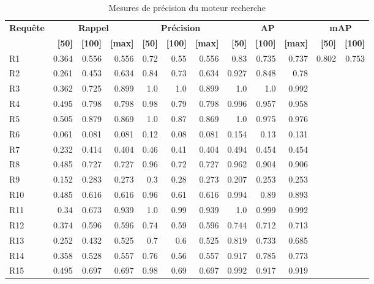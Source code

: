 \begin{table}[H]
\centering
\begin{tabular}{l|rrr|rrr|rrr|rr}
\toprule
\textbf{Requête} & \multicolumn{3}{c}{\textbf{Rappel}} & \multicolumn{3}{c}{\textbf{Précision}} & \multicolumn{3}{c}{\textbf{AP}} & \multicolumn{2}{c}{\textbf{mAP}} \\
 & \textbf{[50]} & \textbf{[100]} & \textbf{[max]} & \textbf{[50]} & \textbf{[100]} & \textbf{[max]} & \textbf{[50]} & \textbf{[100]} & \textbf{[max]} & \textbf{[50]} & \textbf{[100]} \\
\midrule
R1 & 0.364 & 0.556 & 0.556 & 0.72 & 0.55 & 0.556 & 0.83 & 0.735 & 0.737 & \multirow{15}{*}{0.802} & \multirow{15}{*}{0.753} \\
R2 & 0.261 & 0.453 & 0.634 & 0.84 & 0.73 & 0.634 & 0.927 & 0.848 & 0.78 \\
R3 & 0.362 & 0.725 & 0.899 & 1.0 & 1.0 & 0.899 & 1.0 & 1.0 & 0.992 \\
R4 & 0.495 & 0.798 & 0.798 & 0.98 & 0.79 & 0.798 & 0.996 & 0.957 & 0.958 \\
R5 & 0.505 & 0.879 & 0.869 & 1.0 & 0.87 & 0.869 & 1.0 & 0.975 & 0.976 \\
R6 & 0.061 & 0.081 & 0.081 & 0.12 & 0.08 & 0.081 & 0.154 & 0.13 & 0.131 \\
R7 & 0.232 & 0.414 & 0.404 & 0.46 & 0.41 & 0.404 & 0.494 & 0.454 & 0.454 \\
R8 & 0.485 & 0.727 & 0.727 & 0.96 & 0.72 & 0.727 & 0.962 & 0.904 & 0.906 \\
R9 & 0.152 & 0.283 & 0.273 & 0.3 & 0.28 & 0.273 & 0.207 & 0.253 & 0.253 \\
R10 & 0.485 & 0.616 & 0.616 & 0.96 & 0.61 & 0.616 & 0.994 & 0.89 & 0.893 \\
R11 & 0.34 & 0.673 & 0.939 & 1.0 & 0.99 & 0.939 & 1.0 & 0.999 & 0.992 \\
R12 & 0.374 & 0.596 & 0.596 & 0.74 & 0.59 & 0.596 & 0.744 & 0.712 & 0.713 \\
R13 & 0.252 & 0.432 & 0.525 & 0.7 & 0.6 & 0.525 & 0.819 & 0.733 & 0.685 \\
R14 & 0.358 & 0.528 & 0.557 & 0.76 & 0.56 & 0.557 & 0.917 & 0.785 & 0.773 \\
R15 & 0.495 & 0.697 & 0.697 & 0.98 & 0.69 & 0.697 & 0.992 & 0.917 & 0.919 \\
\bottomrule
\end{tabular}
\caption{Mesures de précision du moteur recherche}
\label{tab:results}
\end{table}
